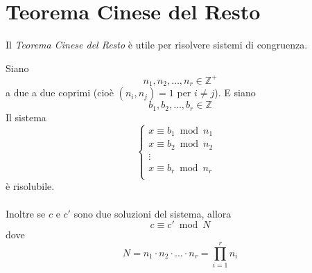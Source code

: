 \documentclass[a4paper,12pt, oneside]{book}
\begin{document}
	\section{Teorema Cinese del Resto}
		Il \textit{Teorema Cinese del Resto} è utile per risolvere sistemi di congruenza.
		\begin{teorema}
			Siano $$n_1, n_2, \dots , n_r \in \mathbb{Z}^+$$
			a due a due coprimi (cioè $(n_i, n_j)=1$ per $i \not = j$).
			E siano $$b_1, b_2, \dots , b_r \in \mathbb{Z}$$
			Il sistema
			$$\begin{cases}
				x \equiv b_1 \bmod n_1\\
				x \equiv b_2 \bmod n_2 & \\
				\vdots\\
				x \equiv b_r \bmod n_r & \\
			\end{cases}$$
			è risolubile.\\\\
			Inoltre se $c$ e $c'$ sono due soluzioni del sistema, allora $$c \equiv c' \bmod N$$
			dove $$N = n_1 \cdot n_2 \cdot \dots \cdot n_r = \prod_{i = 1}^{r} n_i$$
			

\end{teorema}
\end{document}
